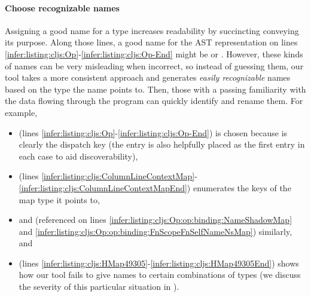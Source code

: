 \paragraph{Choose recognizable names}
Assigning a good name for a type increases
readability by succincting conveying its purpose.
Along those lines, a good name for the AST representation
on lines \ref{infer:listing:cljs:Op}-\ref{infer:listing:cljs:Op-End}
might be  or .
However, these kinds of names can be very misleading when incorrect, so
instead of guessing them,
our tool takes a more consistent approach and generates \emph{easily recognizable}
names based on the type the name points to.
Then, those with a passing familiarity with the data flowing through the program
can quickly identify and rename them.
For example,
\begin{itemize}
  \item
     (lines \ref{infer:listing:cljs:Op}-\ref{infer:listing:cljs:Op-End})
    is chosen because  is
    clearly the dispatch key (the  entry is also helpfully placed
    as the first entry in each case to aid discoverability),
  \item
     (lines \ref{infer:listing:cljs:ColumnLineContextMap}-\ref{infer:listing:cljs:ColumnLineContextMapEnd})
    enumerates the keys of the map type it points to,
  \item
     and  (referenced on lines
    \ref{infer:listing:cljs:Op:op:binding:NameShadowMap} and \ref{infer:listing:cljs:Op:op:binding:FnScopeFnSelfNameNsMap})
    similarly, and
  \item
     (lines \ref{infer:listing:cljs:HMap49305}-\ref{infer:listing:cljs:HMap49305End})
    shows how our tool fails to give names to certain combinations
    of types (we discuss the severity of this particular situation in
    ).
\end{itemize}

